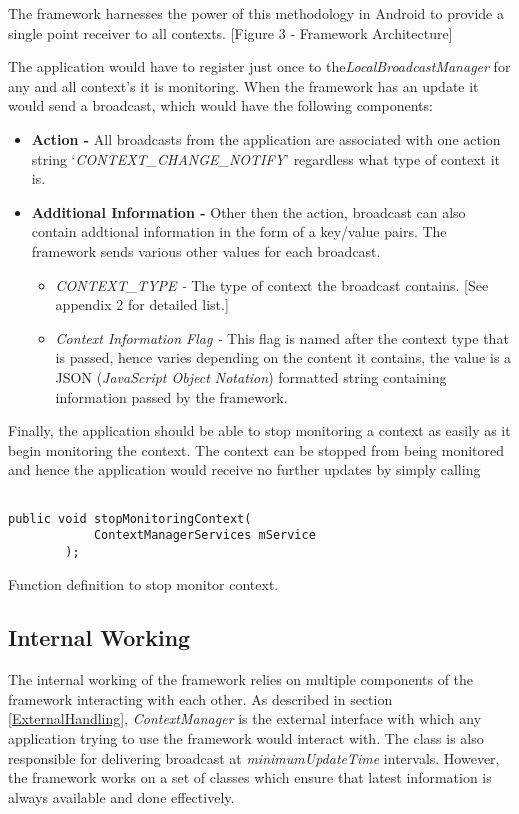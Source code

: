 \documentclass[12pt]{report}
\begin{document}
The framework harnesses the power of this methodology in Android to provide a single point receiver to all contexts. 
[Figure 3 - Framework Architecture]

The application would have to register just once to the\textit{LocalBroadcastManager} for any and all context's it is monitoring. When the framework has an update it would send a broadcast, which would have the following components:
\begin{itemize}
\item \textbf{Action - } All broadcasts from the application are associated with one action string `\textit{CONTEXT\_CHANGE\_NOTIFY}' regardless what type of context it is.
\item \textbf{Additional Information - } Other then the action, broadcast can also contain addtional information in the form of a key/value pairs. The framework sends various other values for each broadcast.
    \begin{itemize}
    \item \textit{CONTEXT\_TYPE - }The type of context the broadcast contains. [See appendix 2 for detailed list.]
    \item \textit{Context Information Flag - }This flag is named after the context type that is passed, hence varies depending on the content it contains, the value is a JSON (\textit{JavaScript Object Notation}) formatted string containing information passed by the framework.
    \end{itemize}
\end{itemize}

Finally, the application should be able to stop monitoring a context as easily as it begin monitoring the context. The context can be stopped from being monitored and hence the application would receive no further updates by simply calling

\begin{program}
  \begin{verbatim}

public void stopMonitoringContext(
            ContextManagerServices mService
        );
\end{verbatim}
\label{monitorContextStopCall}
\caption{Function definition to stop monitor context.}
\end{program}

\subsection{Internal Working}
The internal working of the framework relies on multiple components of the framework interacting with each other. As described in section \ref{ExternalHandling}, \textit{ContextManager} is the external interface with which any application trying to use the framework would interact with. The class is also responsible for delivering broadcast at \textit{minimumUpdateTime} intervals. However, the framework works on a set of classes which ensure that latest information is always available and done effectively.
\end{document}
